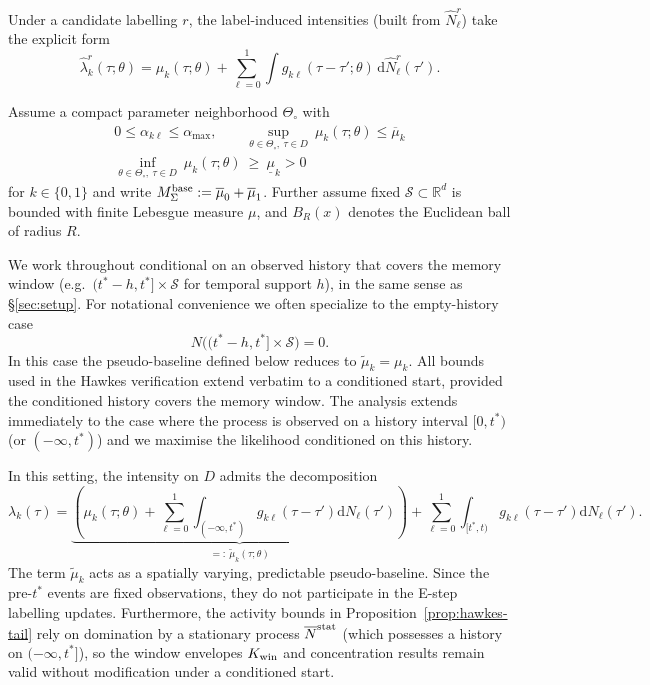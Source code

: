 \documentclass{statsoc}
\newcommand{\dd}{\mathrm{d}}
\newcommand{\bbR}{\mathbb{R}}
\newcommand{\1}{\mathbbm{1}}
\begin{document}
Under a candidate labelling $r$, the label-induced intensities (built from $\widehat N_\ell^r$) take the explicit form
\[
\widehat\lambda_k^r(\tau;\theta)
=\mu_k(\tau;\theta)+\sum_{\ell=0}^1\int g_{k\ell}(\tau-\tau';\theta)\,\dd \widehat N_\ell^r(\tau').
\]


Assume a compact parameter neighborhood $\Theta_\circ$ with
\begin{align*}
0\le \alpha_{k\ell}\le \alpha_{\max},\qquad \sup_{\theta\in\Theta_\circ,\ \tau\in D}\ \mu_k(\tau;\theta)\le \overline\mu_k\\
\inf_{\theta\in\Theta_\circ,\ \tau\in D}\ \mu_k(\tau;\theta)\ \ge\ \underline\mu_k>0
\end{align*}
for \(k\in\{0,1\}\) and write \(M_\Sigma^{\rm base}:=\overline\mu_0+\overline\mu_1\). Further assume fixed $\mathcal S\subset\bbR^d$ is bounded with finite Lebesgue measure $\mu$, and $B_R(x)$ denotes the Euclidean ball of radius $R$.


We work throughout conditional on an observed history that covers the memory window (e.g.\ \((t^\ast-h,t^\ast]\times\mathcal S\) for temporal support \(h\)), in the same sense as \S\ref{sec:setup}. For notational convenience we often specialize to the empty-history case
\begin{equation}\label{eq:Hpre}
\tag{Hpre}
N\big((t^\ast -h,t^\ast]\times\mathcal S\big)=0.
\end{equation}
In this case the pseudo-baseline defined below reduces to \(\tilde\mu_k=\mu_k\).
All bounds used in the Hawkes verification extend verbatim to a conditioned start, provided the conditioned history covers the memory window. The analysis extends immediately to the case where the process is observed on a history interval $[0,t^\ast)$ (or $(-\infty,t^\ast)$) and we maximise the likelihood conditioned on this history.

In this setting, the intensity on $D$ admits the decomposition
\[
\lambda_k(\tau) = \underbrace{\left(\mu_k(\tau;\theta) + \sum_{\ell=0}^1 \int_{(-\infty,t^\ast)} g_{k\ell}(\tau-\tau') \dd N_\ell(\tau')\right)}_{=:\ \tilde\mu_k(\tau;\theta)} + \sum_{\ell=0}^1 \int_{[t^\ast,t)} g_{k\ell}(\tau-\tau') \dd N_\ell(\tau').
\]
The term $\tilde\mu_k$ acts as a spatially varying, predictable pseudo-baseline. Since the pre-$t^\ast$ events are fixed observations, they do not participate in the E-step labelling updates.
Furthermore, the activity bounds in Proposition~\ref{prop:hawkes-tail} rely on domination by a stationary process $\overline N^{\rm stat}$ (which possesses a history on $(-\infty, t^\ast]$), so the window envelopes $K_{\rm win}$ and concentration results remain valid without modification under a conditioned start.
\end{document}
